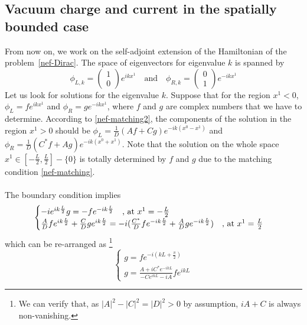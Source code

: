 \subsection{Vacuum charge and current in the spatially bounded case}
From now on, we work on the self-adjoint extension of the Hamiltonian of the problem~\cref{nef-Dirac}.
The space of eigenvectors for eigenvalue $k$ is spanned by
\begin{equation}\label{nef-basisSol}
\phi_{L,k} = 
\begin{pmatrix}
1 \\
0
\end{pmatrix} e^{ikx^1} \quad \textrm{and} \quad
\phi_{R,k} = 
\begin{pmatrix}
0 \\
1
\end{pmatrix} e^{-ikx^1}
\end{equation}
%
Let us look for solutions for the eigenvalue $k$.
Suppose that for the region $x^1<0$, 
 $\phi_L = f e^{ik x^1}$ and $\phi_R = g e^{-ikx^1}$, where $f$ and $g$ are complex numbers that we have to determine. 
According to \cref{nef-matching2}, the components of the solution in the region $x^1 > 0$ should be $\phi_L = \frac{1}{D} (Af+Cg) e^{-ik(x^0 - x^1)}$ and $\phi_R = \frac{1}{D}(C^* f + Ag ) e^{-ik(x^0 + x^1)}$. 
Note that the solution on the whole space $x^1 \in [-\frac{L}{2}, \frac{L}{2}] - \{0\}$ is totally determined by $f$ and $g$ due to the matching condition \cref{nef-matching}. \\\\
The boundary condition implies
\begin{equation}
\begin{cases}
-i e^{ik \frac{L}{2}} g = -f e^{-ik \frac{L}{2}}  \quad \textrm{, at $ x^1 = -\frac{L}{2}$}  \\
\frac{A}{D} f e^{ik \frac{L}{2}} + \frac{C}{D} g e^{ik \frac{L}{2}} = -i (\frac{C^*}{D} f e^{-ik \frac{L}{2}} + \frac{A}{D} g e^{-ik \frac{L}{2}})   \quad \textrm{, at $x^1 = \frac{L}{2}$}
\end{cases}
\end{equation}
which can be re-arranged as
\footnote{We can verify that, as $|A|^2 - |C|^2 = |D|^2 > 0$ by assumption, $iA + C$ is always non-vanishing.} 
\begin{equation}\label{nef-boundCond}
\begin{cases}
g = f e^{-i(kL+ \frac{\pi}{2})}  \\
g = \frac{A + iC^* e^{-ikL}}{- C e^{ikL} - iA} f e^{ikL}
\end{cases}
\end{equation}
